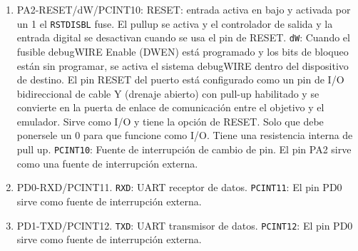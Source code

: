 \begin{enumerate}
\item PA2-RESET/dW/PCINT10: RESET: entrada activa en bajo y activada por un 1 el \texttt{RSTDISBL} fuse. El pullup se activa y el controlador de salida y la entrada digital se desactivan cuando se usa el pin de RESET. \texttt{dW}: Cuando el fusible debugWIRE Enable (DWEN) está programado y los bits de bloqueo están sin programar, se activa el sistema debugWIRE dentro del dispositivo de destino. El pin RESET del puerto está configurado como un pin de I/O bidireccional de cable Y (drenaje abierto) con pull-up habilitado y se convierte en la puerta de enlace de comunicación entre el objetivo y el emulador. Sirve como I/O y tiene la opción de RESET. Solo que debe ponersele un 0 para que funcione como I/O. Tiene una resistencia interna de pull up. \texttt{PCINT10}: Fuente de interrupción de cambio de pin. El pin PA2 sirve como una fuente de interrupción externa.

\item PD0-RXD/PCINT11. \texttt{RXD}: UART receptor de datos. \texttt{PCINT11}: El pin PD0 sirve como fuente de interrupción externa.

\item PD1-TXD/PCINT12. \texttt{TXD}: UART transmisor de datos. \texttt{PCINT12}: El pin PD0 sirve como fuente de interrupción externa.


\end{enumerate}
